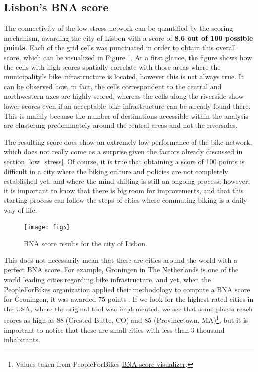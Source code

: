 \documentclass[information,article,submit,moreauthors,pdftex,10pt,a4paper]{mdpi}
\theoremstyle{mdpi}
\newcounter{ex}
\newcounter{re}
\theoremstyle{mdpidefinition}
\begin{document}
\subsection{Lisbon's BNA score} \label{lisbon_bna}

The connectivity of the low-stress network can be quantified by the scoring mechanism, awarding the city of Lisbon with a score of \textbf{8.6 out of 100 possible points}. Each of the grid cells was punctuated in order to obtain this overall score, which can be visualized in Figure \ref{fig5}. At a first glance, the figure shows how the cells with high scores spatially correlate with those areas where the municipality's bike infrastructure is located, however this is not always true. It can be observed how, in fact, the cells correspondent to the central and northwestern axes are highly scored, whereas the cells along the riverside show lower scores even if an acceptable bike infrastructure can be already found there. This is mainly because the number of destinations accessible within the analysis are clustering predominately around the central areas and not the riversides.

The resulting score does show an extremely low performance of the bike network, which does not really come as a surprise given the factors already discussed in section \ref{low_stress}. Of course, it is true that obtaining a score of 100 points is difficult in a city where the biking culture and policies are not completely established yet, and where the mind shifting is still an ongoing process; however, it is important to know that there is big room for improvements, and that this starting process can follow the steps of cities where commuting-biking is a daily way of life.

\begin{figure}[ht!]
	\begin{center}
		\texttt{[image: fig5]}
		\caption{BNA score results for the city of Lisbon.}
		\label{fig5}
	\end{center}
\end{figure}

\bigskip

This does not necessarily mean that there are cities around the world with a perfect BNA score. For example, Groningen in The Netherlands is one of the world leading cities regarding bike infrastructure, and yet, when the PeopleForBikes organization applied their methodology to compute a BNA score for Groningen, it was awarded 75 points \cite{Boldry2017}. If we look for the highest rated cities in the USA, where the original tool was implemented, we see that some places reach scores as high as 88 (Crested Butte, CO) and 85 (Provincetown, MA)\footnote{Values taken from PeopleForBikes \protect\href{http://bna.peopleforbikes.org/}{BNA score visualizer}.}, but it is important to notice that these are small cities with less than 3 thousand inhabitants.
\end{document}
